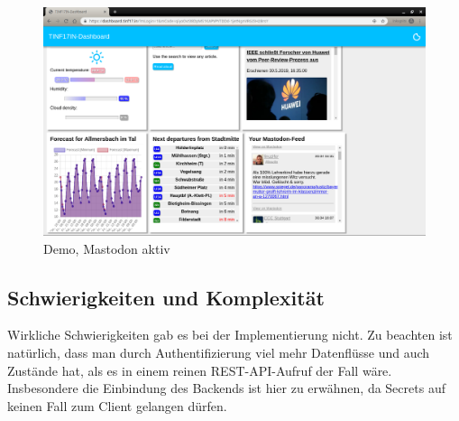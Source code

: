 \documentclass[fleqn,10pt]{SelfArx} %
\begin{document}
\begin{figure}
    \includegraphics[width=\linewidth]{images/3.png}
    \caption{Demo, Mastodon aktiv}\label{fig:demo3}
\end{figure}
\subsection{Schwierigkeiten und Komplexität}
Wirkliche Schwierigkeiten gab es bei der Implementierung nicht. Zu beachten ist natürlich, dass man durch Authentifizierung viel mehr Datenflüsse und auch Zustände hat, als es in einem reinen REST-API-Aufruf der Fall wäre. Insbesondere die Einbindung des Backends ist hier zu erwähnen, da Secrets auf keinen Fall zum Client gelangen dürfen.



\printbibliography%
\end{document}
